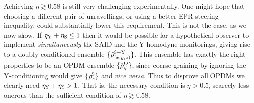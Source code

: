 \documentclass[12pt,prl,floatfix,showpacs,superscriptaddress,amsmath,amssymb]{revtex4}
\renewcommand{\(}{\left(}
\renewcommand{\)}{\right)}
\newcommand{\p}{^{\rm S}}
\newcommand{\ob}{^{\rm O}}
\begin{document}
Achieving  $\eta\gtrsim 0.58$ is still very challenging experimentally. One might hope that choosing a different pair of unravellings, or using a better EPR-steering inequality, could substantially lower this requirement. This is not the case, as we now show.  If $\eta_{\rm Y} + \eta_{\rm S} \leq 1$ then it would be possible for a hypothetical observer to implement {\em simultaneously} the SAID and the Y-homodyne monitorings, giving rise to a doubly-conditioned ensemble $\{\tilde\rho^{\rm S+Y}_{(x,y,z)}\}$. This ensemble has exactly the right properties to be an OPDM ensemble  $\{\tilde\rho\ob_\psi\}$, since coarse graining by ignoring the Y-conditioning would give $\{\tilde\rho\p_x\}$ and {\em vice versa}. Thus  to disprove  all OPDMs we clearly need $\eta_{\rm Y} + \eta_{\rm S} > 1$. That is, the necessary condition is $\eta > 0.5$, 
 scarcely less onerous than the sufficient condition of  $\eta\gtrsim 0.58$. 
 
\end{document}
